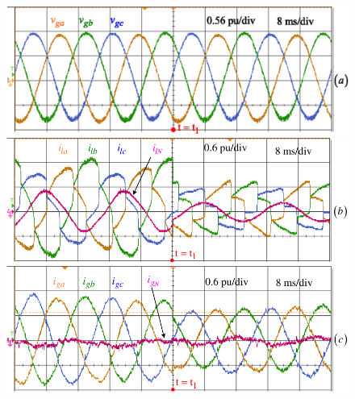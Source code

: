 \begin{figure}   
	\centering
	\includegraphics[scale=0.84]{figures/Chapter_4/Mine/GridVoltages.eps}\\ 
	\label{4.gridvolts}
	\centering
	\includegraphics[scale=0.84]{figures/Chapter_4/Mine/LoadCurrents.pdf}\\ 
	\label{4.loadcurrents}
	\centering
	\includegraphics[scale=0.84]{figures/Chapter_4/Mine/SourceCurrents.pdf}\\ 
	\label{4.sourcecurrents}

\end{figure}
